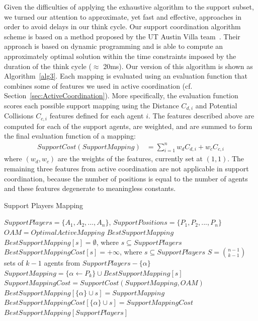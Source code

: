 Given the difficulties of applying the exhaustive algorithm to the support subset, we turned our attention to approximate, yet fast and effective, approaches in order to avoid delays in our think cycle. Our support coordination algorithm scheme is based on a method proposed by the UT Austin Villa team~\cite{UtAustinVillaPaper}. Their approach is based on dynamic programming and is able to compute an approximately optimal solution within the time constraints imposed by the duration of the think cycle ($\approx$ 20ms). Our version of this algorithm is shown as Algorithm~\ref{alg3}. Each mapping is evaluated using an evaluation function that combines some of features we used in active coordination (cf. Section~\ref{sec:ActiveCoordination}). More specifically, the evaluation function scores each possible support mapping using the Distance $C_{d,i}$ and Potential Collisions $C_{c,i}$ features defined for each agent $i$. 
The features described above are computed for each of the support agents, are weighted, and are summed to form the final evaluation function of a mapping: 
\begin{align*}
SupportCost(SupportMapping) &= \sum_{i=1}^n w_dC_{d,i}+w_cC_{c,i}
\end{align*}
where $(w_d,w_c)$ are the weights of the features, currently set at $(1,1)$. The remaining three features from active coordination are not applicable in support coordination, because the number of positions is equal to the number of agents and these features degenerate to meaningless constants. 

\begin{algorithm}[t!]
\caption{Support Players Mapping}
\label{alg3}
\begin{algorithmic}[1]
$SupportPlayers = \lbrace A_{1},A_{2},...,A_{n} \rbrace $, $SupportPositions = \lbrace P_{1},P_{2},...,P_{n} \rbrace $
$OAM=Optimal Active Mapping$
$BestSupport Mapping$
\STATE
\STATE $BestSupportMapping[s] = \emptyset$, where $s \subseteq SupportPlayers$
\STATE $BestSupportMappingCost[s] = +\infty$, where $s \subseteq SupportPlayers$
\STATE $ S = {{n-1}\choose{k-1}} $ sets of $k-1$ agents from $SupportPlayers - \lbrace \alpha \rbrace$
\STATE $SupportMapping = \{\alpha \leftarrow P_{k}\} \cup BestSupportMapping[s]$
\STATE $SupportMappingCost = SupportCost(SupportMapping,OAM)$
\STATE $BestSupportMapping[\{\alpha\} \cup s] = SupportMapping$
\STATE $BestSupportMappingCost[\{\alpha\} \cup s] = SupportMappingCost$
\ENDIF
\ENDFOR
\ENDFOR
\ENDFOR
\RETURN $BestSupportMapping[SupportPlayers]$
\end{algorithmic}
\end{algorithm}

